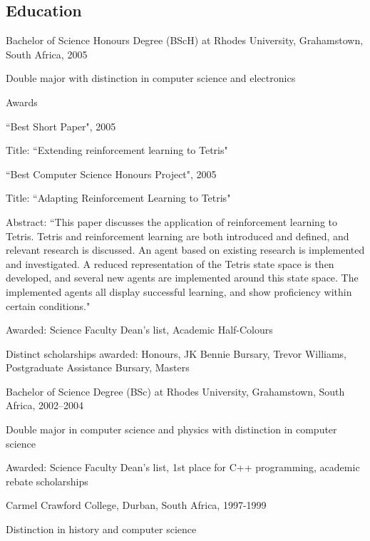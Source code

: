 \documentclass{article}
\begin{document}
\subsection*{Education}
\begin{itemize}
\item{ Bachelor of Science Honours Degree (BScH) at Rhodes University, Grahamstown, South Africa, 2005}
		\item{	``Best Computer Science Honours Project", 2005 }
                \item{ Awarded: Science Faculty Dean's list, Academic Half-Colours}
		\item{ Distinct scholarships awarded: Honours, JK Bennie Bursary, Trevor Williams, Postgraduate Assistance Bursary, Masters}
		\end{itemize*}
	\end{itemize*}
\item{	Bachelor of Science Degree (BSc) at Rhodes University, Grahamstown, South Africa, 2002--2004}
	\begin{itemize*}
	\item{ Double major in computer science and physics with distinction in computer science}
        \item{ Awarded: Science Faculty Dean's list, 1st place for C++ programming, academic rebate scholarships}
	\end{itemize*}
\item{	Carmel Crawford College, Durban, South Africa, 1997-1999}
	\begin{itemize*}
	\item{	Distinction in history and computer science}
	\end{itemize*}
\end{itemize}
\end{document}
